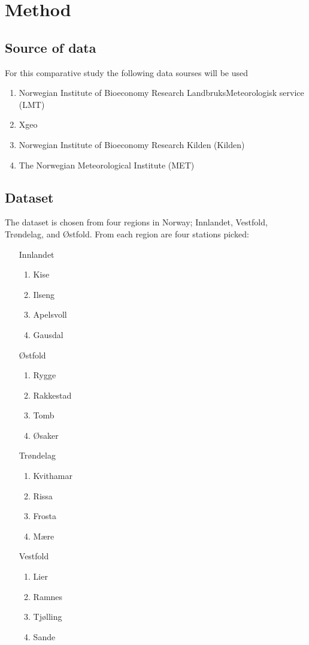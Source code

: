\section{Method}

\subsection{Source of data}

For this comparative study the following data sourses will be used
\begin{enumerate}
	\item Norwegian Institute of Bioeconomy Research LandbruksMeteorologisk service (LMT)
	\item Xgeo
	\item Norwegian Institute of Bioeconomy Research Kilden (Kilden)
	\item The Norwegian Meteorological Institute (MET)
\end{enumerate}

\subsection{Dataset}

The dataset is chosen from four regions in Norway; Innlandet, Vestfold, Trøndelag, and Østfold. From each region are four stations picked:
\begin{multicols}{2}
\begin{itemize}
	\item[Innlandet] \begin{enumerate}
		\item Kise
		\item Ilseng
		\item Apelsvoll
		\item Gausdal
	\end{enumerate}
	\item[Østfold] \begin{enumerate}
		\item Rygge
		\item Rakkestad
		\item Tomb
		\item Øsaker
	\end{enumerate}
	\item[Trøndelag] \begin{enumerate}
		\item Kvithamar
		\item Rissa
		\item Frosta
		\item Mære
	\end{enumerate}
	\item[Vestfold] \begin{enumerate}
		\item Lier
		\item Ramnes
		\item Tjølling
		\item Sande
	\end{enumerate}
\end{itemize}
\end{multicols}

